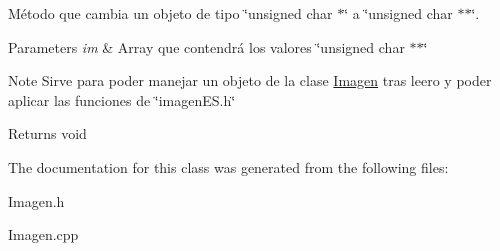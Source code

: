 Método que cambia un objeto de tipo \char`\"{}unsigned char $\ast$\char`\"{} a \char`\"{}unsigned char $\ast$$\ast$\char`\"{}. 


\begin{DoxyParams}{Parameters}
{\em im} & Array que contendrá los valores \char`\"{}unsigned char $\ast$$\ast$\char`\"{} \\
\hline
\end{DoxyParams}
\begin{DoxyNote}{Note}
Sirve para poder manejar un objeto de la clase \hyperlink{classImagen}{Imagen} tras leero y poder aplicar las funciones de \char`\"{}imagen\+E\+S.\+h\char`\"{} 
\end{DoxyNote}
\begin{DoxyReturn}{Returns}
void 
\end{DoxyReturn}


The documentation for this class was generated from the following files\+:\begin{DoxyCompactItemize}
\item 
Imagen.\+h\item 
Imagen.\+cpp\end{DoxyCompactItemize}
